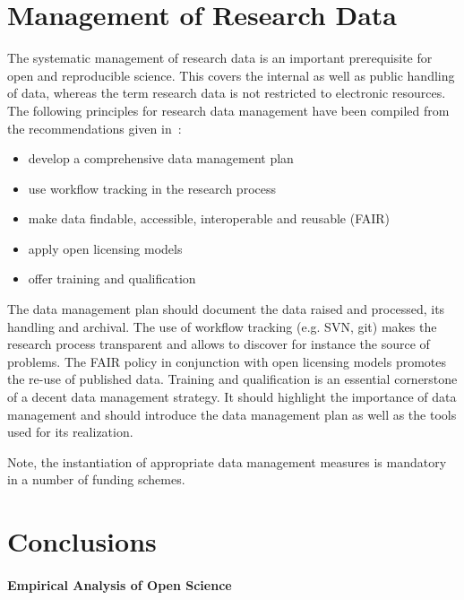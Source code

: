 \documentclass[a4paper, 10pt, twocolumn]{article}
\begin{document}
\section*{Management of Research Data} \label{sec:data_management}

The systematic management of research data is an important prerequisite for open and 
reproducible science. This covers the internal as well as public handling of data, whereas
the term research data is not restricted to electronic resources. The following principles
for research data management have been compiled from the recommendations given 
in~\cite{DFG_GWP:Book,HRK_FDM:WWW,Stodden2014:JORS,H2020_FAIR:ERC}:
\begin{itemize}
\item develop a comprehensive data management plan
\item use workflow tracking in the research process
\item make data findable, accessible, interoperable and reusable (FAIR)~\cite{H2020_FAIR:ERC}
\item apply open licensing models
\item offer training and qualification
\end{itemize}
The data management plan should document the data raised and processed, its handling and
archival. The use of workflow tracking (e.g. SVN, git) makes the research process transparent 
and allows to discover for instance the source of problems. The FAIR policy in conjunction with
open licensing models promotes the re-use of published data. Training and qualification is an
essential cornerstone of a decent data management strategy. It should highlight the importance
of data management and should introduce the data management plan as well as the tools used for
its realization.

Note, the instantiation of appropriate data management measures is mandatory in a number 
of funding schemes.


\section*{Conclusions} \label{sec:conclusions} 

\paragraph*{Empirical Analysis of Open Science}
\end{document}
